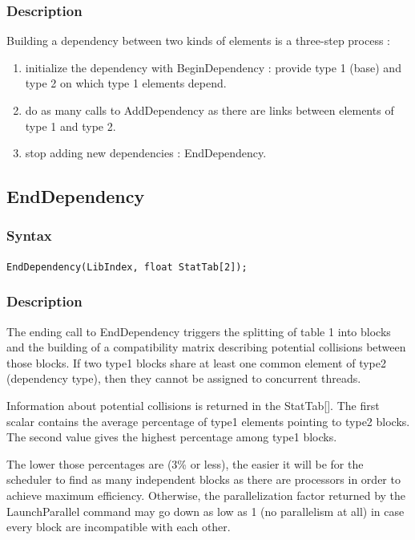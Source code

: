 \documentclass[a4paper,12pt]{article}
\begin{document}
\subsubsection*{Description}
Building a dependency between two kinds of elements is a three-step process :

\begin{enumerate}
	\item initialize the dependency with BeginDependency : provide type 1 (base) and type 2 on which type 1 elements depend.
	\item do as many calls to AddDependency as there are links between elements of type 1 and type 2.
	\item stop adding new dependencies : EndDependency.
\end{enumerate}


\subsection{EndDependency}

\subsubsection*{Syntax}
\tt{EndDependency(LibIndex, float StatTab[2]);}
\normalfont

\subsubsection*{Description}
\label{collisions}

The ending call to EndDependency triggers the splitting of table 1 into blocks and the building of a compatibility matrix describing potential collisions between those blocks. If two type1 blocks share at least one common element of type2 (dependency type), then they cannot be assigned to concurrent threads.

Information about potential collisions is returned in the StatTab[]. The first scalar contains the average percentage of type1 elements pointing to type2 blocks. The second value gives the highest percentage among type1 blocks.

The lower those percentages are (3\% or less), the easier it will be for the scheduler to find as many independent blocks as there are processors in order to achieve maximum efficiency. Otherwise, the parallelization factor returned by the LaunchParallel command may go down as low as 1 (no parallelism at all) in case every block are incompatible with each other.
\end{document}
